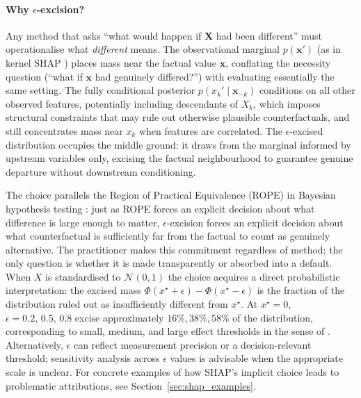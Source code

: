 \paragraph{Why $\epsilon$-excision?}
Any method that asks ``what would happen if $\mathbf{X}$ had been different'' must
operationalise what \emph{different} means. The observational marginal $p(\mathbf{x}')$ (as in kernel SHAP
\citep{lundberg2017unified}) places mass near the factual value $\mathbf{x}$,
conflating the necessity question (``what if $\mathbf{x}$ had genuinely differed?'')
with evaluating essentially the same setting. The fully conditional posterior
$p(x_k' \mid \mathbf{x}_{-k})$ conditions on all other observed features, potentially
including descendants of $X_k$, which imposes structural constraints that may rule
out otherwise plausible counterfactuals, and still concentrates mass near $x_k$ when
features are correlated. The $\epsilon$-excised distribution occupies the middle
ground: it draws from the marginal informed by upstream variables only, excising the
factual neighbourhood to guarantee genuine departure without downstream conditioning.

The choice parallels the Region of Practical Equivalence (ROPE) in Bayesian hypothesis
testing \citep{kruschke2018}: just as ROPE forces an explicit decision about what
difference is large enough to matter, $\epsilon$-excision forces an explicit decision
about what counterfactual is sufficiently far from the factual to count as genuinely
alternative. The practitioner makes this commitment regardless of method; the only
question is whether it is made transparently or absorbed into a default. When $X$ is
standardised to $\mathcal{N}(0,1)$ the choice acquires a direct probabilistic
interpretation: the excised mass $\Phi(x^\star+\epsilon)-\Phi(x^\star-\epsilon)$ is the
fraction of the distribution ruled out as insufficiently different from $x^\star$. At
$x^\star=0$, $\epsilon=0.2,\,0.5,\,0.8$ excise approximately $16\%, 38\%, 58\%$ of the
distribution, corresponding to small, medium, and large effect thresholds in the sense
of \citet{cohen1988statistical}. Alternatively, $\epsilon$ can reflect measurement
precision or a decision-relevant threshold; sensitivity analysis across $\epsilon$
values is advisable when the appropriate scale is unclear. For concrete examples of how
SHAP's implicit choice leads to problematic attributions, see
Section~\ref{sec:shap_examples}.

